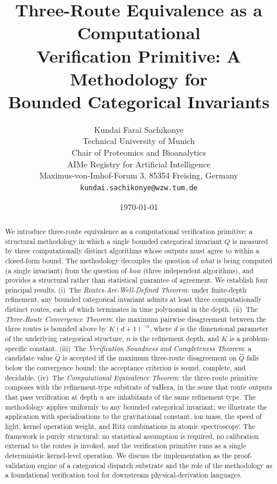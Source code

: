 \documentclass[twocolumn,11pt,a4paper]{article}
\title{\textbf{Three-Route Equivalence as a Computational\\[3pt]
Verification Primitive: A Methodology for\\[2pt]
Bounded Categorical Invariants}}
\author{Kundai Farai Sachikonye\\
Technical University of Munich\\
Chair of Proteomics and Bioanalytics\\
AIMe Registry for Artificial Intelligence\\
Maximus-von-Imhof-Forum 3, 85354 Freising, Germany\\
\texttt{kundai.sachikonye@wzw.tum.de}}
\date{\today}
\newcommand{\Inv}{Q}
\newcommand{\Depth}{n}
\newcommand{\Dim}{d}
\newcommand{\Tolb}{K}
\begin{document}
\maketitle

\begin{abstract}
We introduce three-route equivalence as a computational verification primitive: a structural methodology in which a single bounded categorical invariant $\Inv$ is measured by three computationally distinct algorithms whose outputs must agree to within a closed-form bound. The methodology decouples the question of \emph{what} is being computed (a single invariant) from the question of \emph{how} (three independent algorithms), and provides a structural rather than statistical guarantee of agreement. We establish four principal results. (i)~The \emph{Routes-Are-Well-Defined Theorem}: under finite-depth refinement, any bounded categorical invariant admits at least three computationally distinct routes, each of which terminates in time polynomial in the depth. (ii)~The \emph{Three-Route Convergence Theorem}: the maximum pairwise disagreement between the three routes is bounded above by $\Tolb(\Dim+1)^{-\Depth}$, where $\Dim$ is the dimensional parameter of the underlying categorical structure, $\Depth$ is the refinement depth, and $\Tolb$ is a problem-specific constant. (iii)~The \emph{Verification Soundness and Completeness Theorem}: a candidate value $\hat\Inv$ is accepted iff the maximum three-route disagreement on $\hat\Inv$ falls below the convergence bound; the acceptance criterion is sound, complete, and decidable. (iv)~The \emph{Computational Equivalence Theorem}: the three-route primitive composes with the refinement-type substrate of vaHera, in the sense that route outputs that pass verification at depth $\Depth$ are inhabitants of the same refinement type. The methodology applies uniformly to any bounded categorical invariant; we illustrate the application with specialisations to the gravitational constant, ion mass, the speed of light, kernel operation weight, and Ritz combinations in atomic spectroscopy. The framework is purely structural: no statistical assumption is required, no calibration external to the routes is invoked, and the verification primitive runs as a single deterministic kernel-level operation. We discuss the implementation as the proof-validation engine of a categorical dispatch substrate and the role of the methodology as a foundational verification tool for downstream physical-derivation languages.
\end{abstract}
\end{document}
